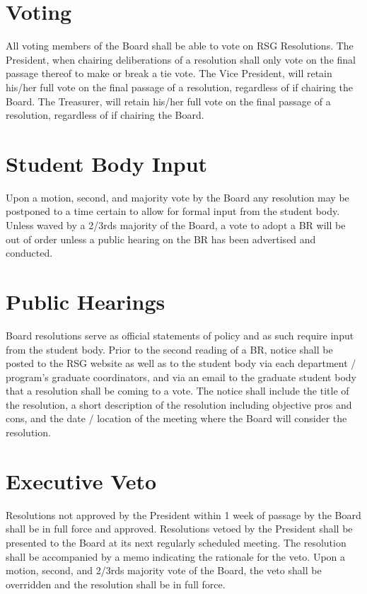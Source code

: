 \section{Voting}
\begin{enumsubsection}
\itemnotoc All voting members of the Board shall be able to vote on RSG 
Resolutions. 
\itemnotoc The President, when chairing deliberations of a resolution shall only vote 
on the final passage thereof to make or break a tie vote. 
\itemnotoc The Vice President, will retain his/her full vote on the final passage of a 
resolution, regardless of if chairing the Board.
\itemnotoc The Treasurer, will retain his/her full vote on the final passage of a 
resolution, regardless of if chairing the Board. 
\end{enumsubsection}
\section{Student Body Input}
\begin{enumsubsection}
\itemnotoc Upon a motion, second, and majority vote by the Board any resolution 
may be postponed to a time certain to allow for formal input from the 
student body. 
\itemnotoc Unless waved by a 2/3rds majority of the Board, a vote to adopt a BR will 
be out of order unless a public hearing on the BR has been advertised 
and conducted. 
\end{enumsubsection}
\section{Public Hearings}
\begin{enumsubsection}
\itemnotoc Board resolutions serve as official statements of policy and as such 
require input from the student body. 
\itemnotoc Prior to the second reading of a BR, notice shall be posted to the RSG 
website as well as to the student body via each department / program's 
graduate coordinators, and via an email to the graduate student body that 
a resolution shall be coming to a vote. The notice shall include the title of 
the resolution, a short description of the resolution including objective pros 
and cons, and the date / location of the meeting where the Board will 
consider the resolution. 
\end{enumsubsection}
\section{Executive Veto}
\begin{enumsubsection}
\itemnotoc Resolutions not approved by the President within 1 week of passage
by the Board shall be in full force and approved. 
Resolutions vetoed by the President shall be presented to the Board at 
its next regularly scheduled meeting. The resolution shall be 
accompanied by a memo indicating the rationale for the veto. Upon a 
motion, second, and 2/3rds majority vote of the Board, the veto shall be 
overridden and the resolution shall be in full force.
\end{enumsubsection}
